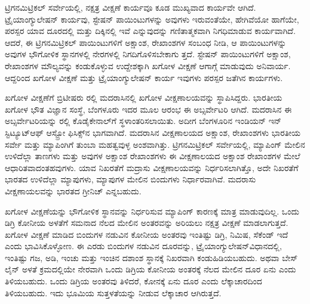 ಟ್ರಿಗನಮಿಟ್ರಿಕಲ್​ ಸರ್ವೇಯಲ್ಲಿ, ನಕ್ಷತ್ರ ವೀಕ್ಷಣೆ ಕಾರ್ಯವೂ ಕೂಡ ಮುಖ್ಯವಾದ ಕಾರ್ಯವೇ ಆಗಿದೆ. ಟ್ರೈಯಾಂಗ್ಯುಲೇಷನ್​ ಕಾರ್ಯವು, ಸ್ಟೇಷನ್​ ಪಾಯಿಂಟುಗಳನ್ನು ಅವುಗಳು ಇರುವಂತೆಯೇ, ಹೇಗಿವೆಯೋ ಹಾಗೆಯೇ, ಪರಸ್ಪರ ಯಾವ ದೂರದಲ್ಲಿ ಮತ್ತು ದಿಕ್ಕಿನಲ್ಲಿ ಇವೆ ಎನ್ನುವುದನ್ನು ಗಣಿತಾತ್ಮಕವಾಗಿ ನಿಗಧಿಮಾಡುವ ಕಾರ್ಯವಾಗಿದೆ. ಆದರೆ, ಈ ಟ್ರಿಗನಮಿಟ್ರಿಕಲ್​ ಪಾಯಿಂಟುಗಳಿಗೆ ಅಕ್ಷಾಂಶ, ರೇಖಾಂಶಗಳ ಸಂಬಂಧ ನೀಡಿ, ಆ ಪಾಯಿಂಟುಗಳನ್ನು ಅವುಗಳ ಭೌಗೋಳಿಕ ಸ್ಥಾನಗಳಲ್ಲಿ ನೇರಗಳಲ್ಲಿ ನಿಗದಿಗೊಳಿಸಬೇಕಾಗು ತ್ತದೆ. ಸ್ಟೇಷನ್​ ಪಾಯಿಂಟುಗಳಿಗೆ ಅಕ್ಷಾಂಶ, ರೇಖಾಂಶಗಳ ಮೌಲ್ಯವನ್ನು ಕಂಡುಕೊಳ್ಳುವ ಉದ್ದೇಶಕ್ಕಾಗಿ ಖಗೋಳ ವೀಕ್ಷಣೆ ಆಗಾಗ್ಗೆ ಮಾಡುವುದು ಅನಿವಾರ್ಯ. ಆದ್ದರಿಂದ ಖಗೋಳ ವೀಕ್ಷಣೆ ಮತ್ತು ಟ್ರೈಯಾಂಗ್ಯುಲೇಷನ್​ ಕಾರ್ಯ ಇವುಗಳು ಪರಸ್ಪರ ಜತೆಗಿನ ಕಾರ್ಯಗಳು.

ಖಗೋಳ ವೀಕ್ಷಣೆಗೆ ಬ್ರಿಟೀಷರು ರಲ್ಲಿ ಮದರಾಸಿನಲ್ಲಿ ಖಗೋಳ ವೀಕ್ಷಣಾಲಯವನ್ನು ಸ್ಥಾಪಿಸಿದ್ದರು. ಭಾರತೀಯ ಖಗೋಳ ಭೌತ ವಿಜ್ಞಾನ ಸಂಸ್ಥೆ, ಬೆಂಗಳೂರು ಇದರ ಮೂಲ ಆರಂಭ ಈ ಅಬ್ಸರ್ವೇಟರಿ ಆಗಿದೆ. ಮದರಾಸಿನ ಈ ಅಬ್ಸರ್ವೇಟರಿಯನ್ನು ರಲ್ಲಿ ಕೊಡೈಕೇನಾಲ್​ಗೆ ಸ್ಥಳಾಂತರಿಸಲಾಯಿತು. ಅದೀಗ ಬೆಂಗಳೂರಿನ ಇಂಡಿಯನ್​ ಇನ್​ಸ್ಟಿಟ್ಯೂಟ್​ ಆಫ್​ ಆಸ್ಟ್ರೋ ಫಿಸಿಕ್ಸ್​ನ ಭಾಗವಾಗಿದೆ. ಮದರಾಸಿನ ವೀಕ್ಷಣಾಲಯದ ಅಕ್ಷಾಂಶ, ರೇಖಾಂಶಗಳು ಭಾರತೀಯ ಸರ್ವೇ ಮತ್ತು ಮ್ಯಾಪಿಂಗಿಗೆ ತುಂಬಾ ಮಹತ್ವವುಳ್ಳ ಅಂಶವಾಗಿತ್ತು. ಟ್ರಿಗನಮಿಟ್ರಿಕಲ್​ ಸರ್ವೇಯಲ್ಲಿ, ಮ್ಯಾಪಿಂಗ್​ ಮೇಲಿನ ಉಳಿದೆಲ್ಲಾ ತಾಣಗಳು ಮತ್ತು ಅವುಗಳ ಅಕ್ಷಾಂಶ ರೇಖಾಂಶಗಳು ಈ ವೀಕ್ಷಣಾಲಯದ ಅಕ್ಷಾಂಶ ರೇಖಾಂಶಗಳ ಮೇಲೆ ಆಧಾರಿತವಾದಂತಹವುಗಳು. ಯಾವ ನಿಖರತೆಗೆ ಮದ್ರಾಸು ವೀಕ್ಷಣಾಲಯವನ್ನು ನಿರ್ಧರಿಸಲಾಗಿತ್ತೊ, ಅದೇ ನಿಖರತೆಗೆ ಭಾರತದ ಉಳಿದೆಲ್ಲಾ ಮ್ಯಾಪುಗಳು, ಮ್ಯಾಪುಗಳ ಮೇಲಿನ ಬಿಂದುಗಳು ನಿರ್ಧಾರವಾಗಿವೆ. ಮದರಾಸು ವೀಕ್ಷಣಾಯಲವನ್ನು ಭಾರತದ ಗ್ರೀನಿಚ್​ ಎನ್ನಬಹುದು.

\newpage

ಖಗೋಳ ವೀಕ್ಷಣೆಯನ್ನು ಭೌಗೋಳಿಕ ಸ್ಥಾನವನ್ನು ನಿರ್ಧರಿಸುವ ಮ್ಯಾಪಿಂಗ್​ ಕಾರಣಕ್ಕೆ ಮಾತ್ರ ಮಾಡುವುದಿಲ್ಲ. ಒಂದು ಡಿಗ್ರಿ ಕೋನೀಯ ಅಳತೆಗೆ ಸಮನಾದ ನೆಲದ ಮೇಲಿನ ಅಂತರವನ್ನು ಅರಿಯಲು ನಕ್ಷತ್ರ ವೀಕ್ಷಣೆ ಮಾಡಲಾಗುತ್ತದೆ. ಖಗೋಳ ವೀಕ್ಷಣೆ ಮಾಡಿದ  ಬಿಂದುಗಳ ನಡುವಿನ ಕೋನೀಯ ಅಂತರವು ಇಂತಿಷ್ಟು ಡಿಗ್ರಿ, ನಿಮಿಷ, ಸೆಕೆಂಡ್​ ಇದೆ ಎಂದು ಭಾವಿಸಿಕೊಳ್ಳೋಣ. ಈ ಎರಡು ಬಿಂದುಗಳ ನಡುವಿನ ದೂರವನ್ನು, ಟ್ರೈಯಾಂಗ್ಯುಲೇಷನ್​ ವಿಧಾನದಲ್ಲಿ, ಇಂತಿಷ್ಟು ಗಜ, ಅಡಿ, ಇಂಚು ಮತ್ತು ಇಂಚಿನ ದಶಾಂಶ ಸ್ಥಾನಕ್ಕೆ ನಿಖರವಾಗಿ ಕಂಡುಹಿಡಿಯಬಹುದು. ಅಥವಾ ಬೇಸ್​ ಲೈನ್​ ಅಳತೆ ಕ್ರಮದಲ್ಲಿಯೇ ನೇರವಾಗಿ ಒಂದು ಡಿಗ್ರಿಯ ಕೋನೀಯ ಅಂತರಕ್ಕೆ ನೆಲದ ಮೇಲಿನ ದೂರ ಏನು ಎಂದು ತಿಳಿಯಬಹುದು. ಒಂದು ಡಿಗ್ರಿಯ ಅಂತರವು ತಿಳಿದರೆ,  ಕೋನಕ್ಕೆ ಏನು ದೂರ ಎಂದು ಲೆಕ್ಕಾಚಾರದಿಂದ ತಿಳಿಯಬಹುದು. ಇದು ಭೂಮಿಯ ಸುತ್ತಳತೆಯನ್ನು ನೀಡುವ ಲೆಕ್ಕಾಚಾರ ಆಗಿರುತ್ತದೆ.

\vskip 4pt

